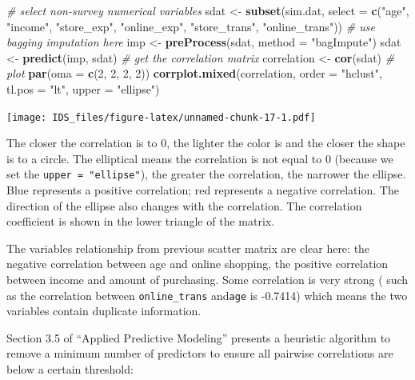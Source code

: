 \documentclass[12pt,]{krantz}
\makeatletter
\newenvironment{Shaded}{\begin{snugshade}}{\end{snugshade}}
\newcommand{\CommentTok}[1]{\textcolor[rgb]{0.37,0.37,0.37}{\textit{#1}}}
\newcommand{\DataTypeTok}[1]{\textcolor[rgb]{0.27,0.27,0.27}{#1}}
\newcommand{\DecValTok}[1]{\textcolor[rgb]{0.06,0.06,0.06}{#1}}
\newcommand{\KeywordTok}[1]{\textcolor[rgb]{0.27,0.27,0.27}{\textbf{#1}}}
\newcommand{\NormalTok}[1]{#1}
\newcommand{\StringTok}[1]{\textcolor[rgb]{0.5,0.5,0.5}{#1}}
\newenvironment{kframe}{%
\medskip{}
\setlength{\fboxsep}{.8em}
 \def\at@end@of@kframe{}%
 \ifinner\ifhmode%
  \def\at@end@of@kframe{\end{minipage}}%
  \begin{minipage}{\columnwidth}%
 \fi\fi%
 \def\FrameCommand##1{\hskip\@totalleftmargin \hskip-\fboxsep
 \colorbox{shadecolor}{##1}\hskip-\fboxsep
     \hskip-\linewidth \hskip-\@totalleftmargin \hskip\columnwidth}%
 \MakeFramed {\advance\hsize-\width
   \@totalleftmargin\z@ \linewidth\hsize
   \@setminipage}}%
 {\par\unskip\endMakeFramed%
 \at@end@of@kframe}
\renewenvironment{Shaded}{\begin{kframe}}{\end{kframe}}
\makeatother
\begin{document}
\begin{Shaded}
\begin{Highlighting}[]
\CommentTok{# select non-survey numerical variables}
\NormalTok{sdat <-}\StringTok{ }\KeywordTok{subset}\NormalTok{(sim.dat, }\DataTypeTok{select =} \KeywordTok{c}\NormalTok{(}\StringTok{"age"}\NormalTok{, }\StringTok{"income"}\NormalTok{, }\StringTok{"store_exp"}\NormalTok{, }\StringTok{"online_exp"}\NormalTok{, }
    \StringTok{"store_trans"}\NormalTok{, }\StringTok{"online_trans"}\NormalTok{))}
\CommentTok{# use bagging imputation here}
\NormalTok{imp <-}\StringTok{ }\KeywordTok{preProcess}\NormalTok{(sdat, }\DataTypeTok{method =} \StringTok{"bagImpute"}\NormalTok{)}
\NormalTok{sdat <-}\StringTok{ }\KeywordTok{predict}\NormalTok{(imp, sdat)}
\CommentTok{# get the correlation matrix}
\NormalTok{correlation <-}\StringTok{ }\KeywordTok{cor}\NormalTok{(sdat)}
\CommentTok{# plot}
\KeywordTok{par}\NormalTok{(}\DataTypeTok{oma =} \KeywordTok{c}\NormalTok{(}\DecValTok{2}\NormalTok{, }\DecValTok{2}\NormalTok{, }\DecValTok{2}\NormalTok{, }\DecValTok{2}\NormalTok{))}
\KeywordTok{corrplot.mixed}\NormalTok{(correlation, }\DataTypeTok{order =} \StringTok{"hclust"}\NormalTok{, }\DataTypeTok{tl.pos =} \StringTok{"lt"}\NormalTok{, }\DataTypeTok{upper =} \StringTok{"ellipse"}\NormalTok{)}
\end{Highlighting}
\end{Shaded}

\texttt{[image: IDS\_files/figure-latex/unnamed-chunk-17-1.pdf]}

The closer the correlation is to 0, the lighter the color is and the closer the shape is to a circle. The elliptical means the correlation is not equal to 0 (because we set the \texttt{upper\ =\ "ellipse"}), the greater the correlation, the narrower the ellipse. Blue represents a positive correlation; red represents a negative correlation. The direction of the ellipse also changes with the correlation. The correlation coefficient is shown in the lower triangle of the matrix.

The variables relationship from previous scatter matrix are clear here: the negative correlation between age and online shopping, the positive correlation between income and amount of purchasing. Some correlation is very strong ( such as the correlation between \texttt{online\_trans} and\texttt{age} is -0.7414) which means the two variables contain duplicate information.

Section 3.5 of ``Applied Predictive Modeling'' \citep{APM} presents a heuristic algorithm to remove a minimum number of predictors to ensure all pairwise correlations are below a certain threshold:
\end{document}
